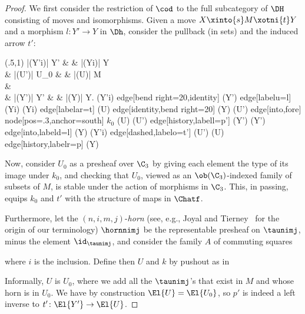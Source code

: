 \documentclass{LMCS}
\theoremstyle{plain}\newtheorem{satz}[thm]{Satz}
\begin{document}
\begin{proof}
  We first consider the restriction of $\cod$ to the full subcategory
  of $\DH$ consisting of moves and isomorphisms.  Given a move $X
  \xinto{s} M \xotni{t} Y$ and a morphism $l \colon Y' \to Y$ in
  $\Dh$, consider the pullback (in sets) and the induced arrow $t'$:
  \begin{center}
    \Diag(.5,1){ }{|(Y'i)| Y' \& \& |(Yi)| Y \\
      \& |(U')| U_0 \& \& |(U)| M \\
      \& \  \\
      \& |(Y')| Y' \& \& |(Y)| Y. }{(Y'i) edge[bend right=20,identity] (Y') edge[labelu={l}] (Yi) (Yi) edge[labelar={t}] (U) edge[identity,bend right=20] (Y) (U') edge[into,fore] node[pos=.3,anchor=south] {$\scriptstyle k_0$} (U) (U') edge[history,labell={p'}] (Y') (Y') edge[into,labeld={l}] (Y) (Y'i) edge[dashed,labelo={t'}] (U')
      (U) edge[history,labelr={p}] (Y) }
  \end{center}
  Now, consider $U_0$ as a presheaf over $\C_3$ by giving each element
  the type of its image under $k_0$, and checking that $U_0$, viewed
  as an $\ob (\C_3)$-indexed family of subsets of $M$, is stable under
  the action of morphisms in $\C_3$. This, in passing, equips $k_0$
  and $t'$ with the structure of maps in $\Chatf$.

  Furthermore, let the $(n,i,m,j)$-\emph{horn} (see, e.g., Joyal and
  Tierney~\cite{JoyalTierney} for the origin of our terminology)
  $\hornnimj$ be the representable presheaf on $\taunimj$, minus the
  element $\id_{\taunimj}$, and consider the family $A$ of commuting
  squares
  \begin{center}
  \end{center}
  where $i$ is the inclusion. Define then $U$ and $k$ by pushout as in
   \begin{center}
  \end{center}
  Informally, $U$ is $U_0$, where we add all the $\taunimj$'s that
  exist in $M$ and whose horn is in $U_0$. We have by construction
  $\El{U} = \El{U_0}$, so $p'$ is indeed a left inverse to $t' \colon
  \El{Y'} \to \El{U}$.


\end{proof}
\end{document}
